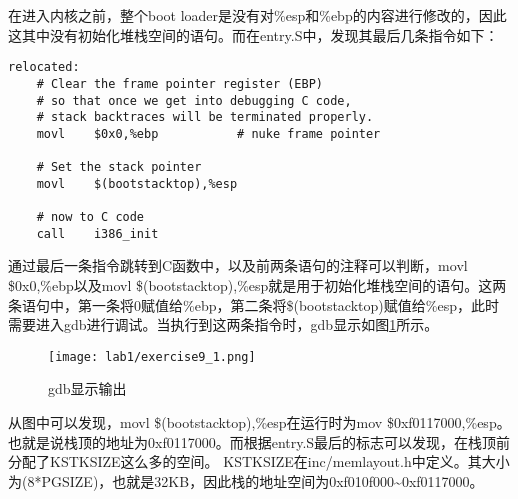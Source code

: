 \begin{exerciseSolution}{9}
    \par 在进入内核之前，整个boot loader是没有对\%esp和\%ebp的内容进行修改的，因此这其中没有初始化堆栈空间的语句。而在entry.S中，发现其最后几条指令如下：
    \begin{lstlisting}
relocated:
    # Clear the frame pointer register (EBP)
    # so that once we get into debugging C code,
    # stack backtraces will be terminated properly.
    movl	$0x0,%ebp			# nuke frame pointer

    # Set the stack pointer
    movl	$(bootstacktop),%esp

    # now to C code
    call	i386_init
    \end{lstlisting}
    \par 通过最后一条指令跳转到C函数中，以及前两条语句的注释可以判断，movl \$0x0,\%ebp以及movl \$(bootstacktop),\%esp就是用于初始化堆栈空间的语句。这两条语句中，第一条将0赋值给\%ebp，第二条将\$(bootstacktop)赋值给\%esp，此时需要进入gdb进行调试。当执行到这两条指令时，gdb显示如图\ref{fig:exercise9_1}所示。
    \begin{figure}[htb]
        \centering
        \texttt{[image: lab1/exercise9\_1.png]}
        \caption{gdb显示输出}
        \label{fig:exercise9_1}
    \end{figure}
    \par 从图中可以发现，movl \$(bootstacktop),\%esp在运行时为mov \$0xf0117000,\%esp。也就是说栈顶的地址为0xf0117000。而根据entry.S最后的标志可以发现，在栈顶前分配了KSTKSIZE这么多的空间。 KSTKSIZE在inc/memlayout.h中定义。其大小为(8*PGSIZE)，也就是32KB，因此栈的地址空间为0xf010f000\textasciitilde 0xf0117000。


\end{exerciseSolution}
